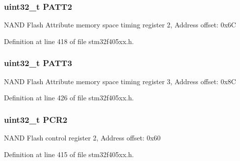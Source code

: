 \subsubsection[{\texorpdfstring{P\+A\+T\+T2}{PATT2}}]{ uint32\+\_\+t P\+A\+T\+T2}\hypertarget{struct_f_s_m_c___bank2__3___type_def_a9c1bc909ec5ed32df45444488ea6668b}{}\label{struct_f_s_m_c___bank2__3___type_def_a9c1bc909ec5ed32df45444488ea6668b}
N\+A\+ND Flash Attribute memory space timing register 2, Address offset\+: 0x6C 

Definition at line 418 of file stm32f405xx.\+h.

\subsubsection[{\texorpdfstring{P\+A\+T\+T3}{PATT3}}]{ uint32\+\_\+t P\+A\+T\+T3}\hypertarget{struct_f_s_m_c___bank2__3___type_def_aba03fea9c1bb2242d963e29f1b94d25e}{}\label{struct_f_s_m_c___bank2__3___type_def_aba03fea9c1bb2242d963e29f1b94d25e}
N\+A\+ND Flash Attribute memory space timing register 3, Address offset\+: 0x8C 

Definition at line 426 of file stm32f405xx.\+h.

\subsubsection[{\texorpdfstring{P\+C\+R2}{PCR2}}]{ uint32\+\_\+t P\+C\+R2}\hypertarget{struct_f_s_m_c___bank2__3___type_def_ab0cb1d704ee64c62ad5be55522a2683a}{}\label{struct_f_s_m_c___bank2__3___type_def_ab0cb1d704ee64c62ad5be55522a2683a}
N\+A\+ND Flash control register 2, Address offset\+: 0x60 

Definition at line 415 of file stm32f405xx.\+h.

